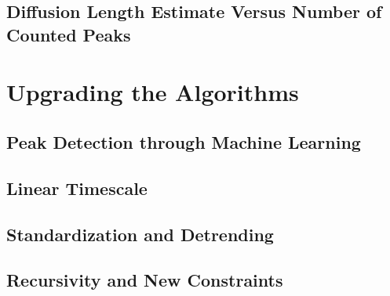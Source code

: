 \documentclass[../../CompleteThesis/Complete_1stDraft.tex]{subfiles}
\begin{document}
	\subsection[Maximal $N_{\text{peaks}}$]{Diffusion Length Estimate Versus Number of Counted Peaks}
	\label{Subsec:Method_StabilityTests_MaxNPeaks}
	
	
	
	\section[Upgrading the Algorithms]{Upgrading the Algorithms}
	\label{Sec:Method_UpgradingAlgorithms}
	\subsection[Peak Detection: ML]{Peak Detection through Machine Learning}
	\label{Subsec:Method_UpgradingAlgorithms_PeakDetectionML}
	
	
	\subsection[Linear Timescale]{Linear Timescale}
	\label{Subsec:Method_UpgradingAlgorithms_LinearTimescale}
	
	
	\subsection[Standardization]{Standardization and Detrending}
	\label{Subsec:Method_UpgradingAlgorithms_Standardization}
	
	
	\subsection[Recursivity and Constraints]{Recursivity and New Constraints}
	\label{Subsec:Method_UpgradingAlgorithms_RecurseAndConstraints}
	
	
	
	
\end{document}
